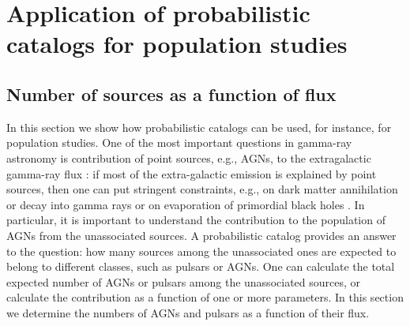 \section{Application of probabilistic catalogs for population studies}

\subsection{Number of sources as a function of flux}


In this section we show how probabilistic catalogs can be used, for instance, for population studies.
One of the most important questions in gamma-ray astronomy is contribution of point sources, 
e.g., AGNs, to the extragalactic gamma-ray flux 
\citep[e.g.,][]{2010ApJ...720..435A, 2011ApJ...738..181M, 2016PhRvL.116o1105A, 2016ApJS..225...18Z, 2016ApJ...826L..31Z, 2016ApJ...832..117L, 2018ApJ...856..106D}:
if most of the extra-galactic emission is explained by point sources, then one can put stringent constraints, 
e.g., on  dark matter annihilation or decay into gamma rays 
\citep{2015ApJ...800L..27A, 2015PhRvD..91l3001D, 2015JCAP...09..008F, 2015PhR...598....1F, 2017ChPhC..41d5104L} or 
on evaporation of primordial black holes \citep{2010PhRvD..81j4019C}.
In particular, it is important to understand the contribution to the population of AGNs from the unassociated sources.
A probabilistic catalog provides an answer to the question: how many sources among the unassociated ones are expected to belong to different classes, such as pulsars or AGNs. 
One can calculate the total expected number of AGNs or pulsars among the unassociated sources, or calculate the contribution as a function of one or more parameters.
In this section we determine the numbers of AGNs and pulsars as a function of their flux.



